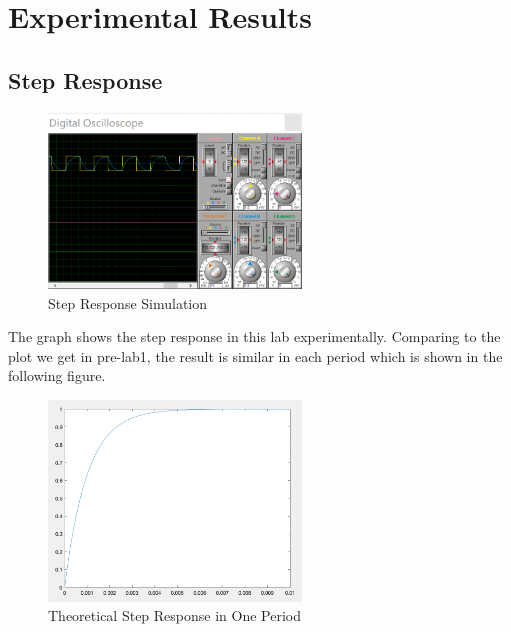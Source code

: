 \documentclass [utf8] {article}
\begin{document}
\section{Experimental Results}
{
    \subsection{Step Response}
    {
        \begin{figure}
            \begin{small}
                \begin{center}
                    \includegraphics[width=0.6\textwidth]{figures/Figure2.png}
                \end{center}
                \caption{Step Response Simulation}
                \label{fig:fig2}
            \end{small}
        \end{figure}
        The graph shows the step response in this lab experimentally. Comparing to the plot we get in pre-lab1, the result is similar in each period which is shown in the following figure.

        \begin{figure}[H]
            \begin{small}
                \begin{center}
                    \includegraphics[width=0.6\textwidth]{figures/Figure2_1.png}
                \end{center}
                \caption{Theoretical Step Response in One Period}
                \label{fig:fig2_1}
            \end{small}
        \end{figure}
    }

}
\end{document}
